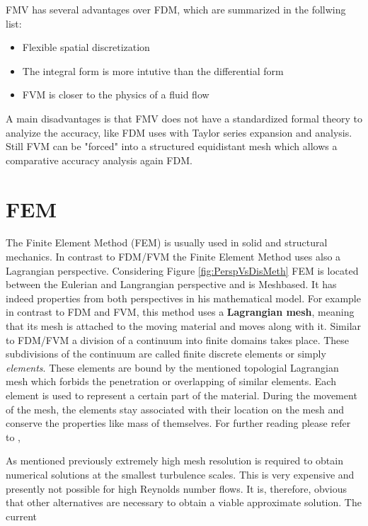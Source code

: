 FMV has several advantages over FDM, which are summarized in the follwing list:

\begin{itemize}
\item Flexible spatial discretization
\item The integral form is more intutive than the differential form
\item FVM is closer to the physics of a fluid flow
\end{itemize}

A main disadvantages is that FMV does not have a standardized formal theory to
analyize the accuracy, like FDM uses with Taylor series expansion and analysis.
Still FVM can be "forced" into a structured equidistant mesh which allows a comparative accuracy analysis again FDM.

\section{FEM}
\label{sec:main_fem}
The Finite Element Method (FEM) is usually used in solid and structural mechanics. In contrast to FDM/FVM the Finite Element Method uses also a Lagrangian perspective. Considering Figure \ref{fig:PerspVsDisMeth} FEM is located between the Eulerian
and Langrangian perspective and is Meshbased. It has indeed properties from both
perspectives in his mathematical model. For example in contrast to FDM and FVM, this method uses a \textbf{Lagrangian mesh}, meaning that its mesh is attached to the moving material and moves along with it. Similar to FDM/FVM a division of a continuum into finite domains takes place. These subdivisions of the continuum are called finite discrete elements or simply \emph{elements}. These elements are bound by the mentioned topologial Lagrangian mesh which forbids the penetration or overlapping of similar elements. Each element is used to represent a certain part of the material. During the movement of the mesh, the elements stay associated with their location on the mesh and conserve the properties like mass of themselves.
For further reading please refer to \citep {Zienkiewicz2005}, \citep[chap. 10]{Wendt2009}


As mentioned previously extremely high mesh resolution is required to obtain
numerical solutions at the smallest turbulence scales. This is very expensive and
presently not possible for high Reynolds number flows. It is, therefore, obvious that
other alternatives are necessary to obtain a viable approximate solution. The current

